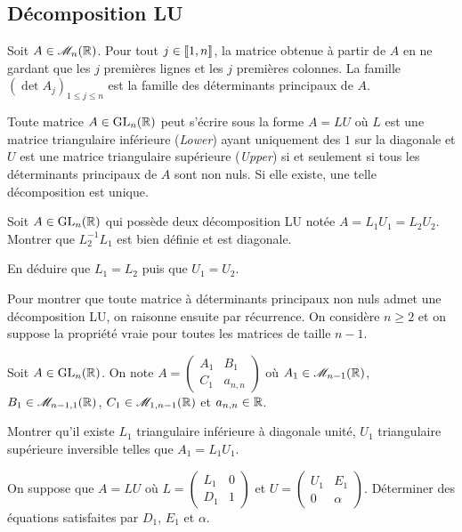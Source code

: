 

\subsection{Décomposition LU}


Soit $A \in \mathscr{M}_n(\mathbb{R})$. Pour tout $j \in \llbracket1,n\rrbracket$, la matrice obtenue à partir de $A$ en ne gardant que les $j$ premières lignes et les $j$ premières colonnes. La famille $(\det A_j)_{1 \leq j \leq n}$ est la famille des déterminants principaux de $A$.

\begin{theo}[Décomposition LU (ou LR)]
Toute matrice $A \in \mathrm{GL}_n(\mathbb{R})$ peut s'écrire sous la forme $A = L U$ où $L$ est une matrice triangulaire inférieure (\textit{Lower}) ayant uniquement des $1$ sur la diagonale et $U$ est une matrice triangulaire supérieure (\textit{Upper}) si et seulement si tous les déterminants principaux de $A$ sont non nuls. Si elle existe, une telle décomposition est unique.
\end{theo}

Soit $A \in \mathrm{GL}_n(\mathbb{R})$ qui possède deux décomposition LU notée $A = L_1 U_1 = L_2 U_2$.
Montrer que $L_2^{-1} L_1$ est bien définie et est diagonale.

En déduire que $L_1 = L_2$ puis que $U_1 = U_2$.

\medskip

Pour montrer que toute matrice à déterminants principaux non nuls admet une décomposition LU, on raisonne ensuite par récurrence. On considère $n \geq 2$ et on suppose la propriété vraie pour toutes les matrices de taille $n-1$.

Soit $A \in \mathrm{GL}_n(\mathbb{R})$. On note $A = \begin{pmatrix} A_1 & B_1 \\ C_1 & a_{n,n} \end{pmatrix}$ où $A_1 \in \mathscr{M}_{n-1}(\mathbb{R})$, $B_1 \in \mathscr{M}_{n-1,1}(\mathbb{R})$, $C_1 \in \mathscr{M}_{1,n-1}(\mathbb{R})$ et $a_{n,n} \in \mathbb{R}$.

Montrer qu'il existe $L_1$ triangulaire inférieure à diagonale unité, $U_1$ triangulaire supérieure inversible telles que $A_1 = L_1 U_1$.

On suppose que $A = L U$ où $L = \begin{pmatrix} L_1 & 0 \\ D_1 & 1 \end{pmatrix}$ et $U = \begin{pmatrix} U_1 & E_1 \\ 0 & \alpha \end{pmatrix}$. Déterminer des équations satisfaites par $D_1,\, E_1$ et $\alpha$. 

